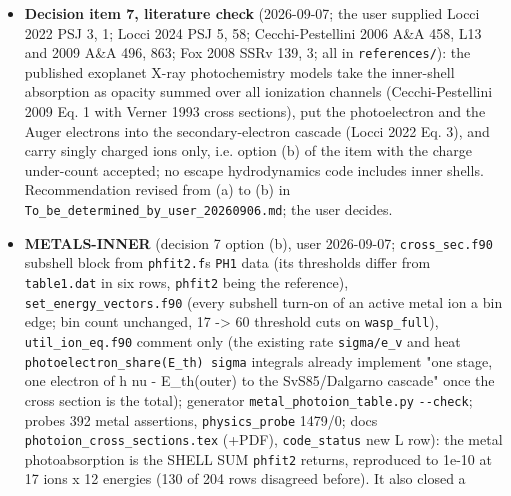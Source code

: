 \documentclass[english,a4paper]{my_memo}
\begin{document}
\begin{itemize}
  each cell\textquotesingle s depth is now \texttt{sqrt(pi)} times the line-centre depth in
  \texttt{fine\_structure\_line\_transfer}. MEASURED regime on the shipped columns:
  largest line-centre depth 0.14 ({[}O I{]} 63 um at the hot-Uranus base), so the
  factor there is 1.12 and the change of the total radiative losses is below
  0.1 percent (\texttt{mol\_metals} 0.096 percent), but a factor of two in any base
  thick in these lines and in the \texttt{Base\ IR\ field} incident term the same
  beta scales. \texttt{physics\_probe} 1291/0 after the fix. Metals cases move at
  the gate at that level.
\item
  \textbf{Decision item 7, literature check} (2026-09-07; the user supplied
  Locci 2022 PSJ 3, 1; Locci 2024 PSJ 5, 58; Cecchi-Pestellini 2006 A\&A
  458, L13 and 2009 A\&A 496, 863; Fox 2008 SSRv 139, 3; all in
  \texttt{references/}): the published exoplanet X-ray photochemistry models take
  the inner-shell absorption as opacity summed over all ionization channels
  (Cecchi-Pestellini 2009 Eq. 1 with Verner 1993 cross sections), put the
  photoelectron and the Auger electrons into the secondary-electron cascade
  (Locci 2022 Eq. 3), and carry singly charged ions only, i.e. option (b) of
  the item with the charge under-count accepted; no escape hydrodynamics
  code includes inner shells. Recommendation revised from (a) to (b) in
  \texttt{To\_be\_determined\_by\_user\_20260906.md}; the user decides.
\item
  \textbf{METALS-INNER} (decision 7 option (b), user 2026-09-07; \texttt{cross\_sec.f90}
  subshell block from \texttt{phfit2.f}\textquotesingle s \texttt{PH1} data (its thresholds differ from
  \texttt{table1.dat} in six rows, \texttt{phfit2} being the reference),
  \texttt{set\_energy\_vectors.f90} (every subshell turn-on of an active metal ion a
  bin edge; bin count unchanged, 17 -\textgreater{} 60 threshold cuts on \texttt{wasp\_full}),
  \texttt{util\_ion\_eq.f90} comment only (the existing rate \texttt{sigma/e\_v} and heat
  \texttt{photoelectron\_share(E\_th)\ sigma} integrals already implement "one stage,
  one electron of h nu - E\_th(outer) to the SvS85/Dalgarno cascade" once the
  cross section is the total); generator \texttt{metal\_photoion\_table.py} \texttt{-\/-check};
  probes 392 metal assertions, \texttt{physics\_probe} 1479/0; docs
  \texttt{photoion\_cross\_sections.tex} (+PDF), \texttt{code\_status} new L row): the metal
  photoabsorption is the SHELL SUM \texttt{phfit2} returns, reproduced to 1e-10 at
  17 ions x 12 energies (130 of 204 rows disagreed before). It also closed a

\end{itemize}
\end{document}
